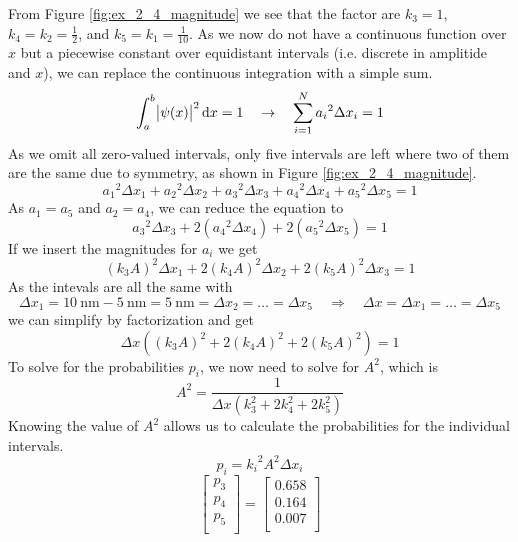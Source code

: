 From Figure \ref{fig:ex_2_4_magnitude} we see that the factor are
$k_3 = 1$, $k_4=k_2=\frac{1}{2}$, and $k_5=k_1=\frac{1}{10}$.
As we now do not have a continuous function over $x$ but a piecewise
constant over equidistant intervals (i.e. discrete in amplitide and $x$),
we can replace the continuous integration with a simple sum.
\[
	\int_a^b \abs{\psi(x)}^2 \dif x = 1
	\quad \rightarrow \quad
	\sum_{i=1}^{N} {a_i}^2 \Delta x_i = 1
\]
As we omit all zero-valued intervals, only five intervals are left where two
of them are the same due to symmetry, as shown in Figure
\ref{fig:ex_2_4_magnitude}.
\[
	{a_1}^2 \Delta x_1 + {a_2}^2 \Delta x_2 + {a_3}^2 \Delta x_3 + {a_4}^2 \Delta x_4 + {a_5}^2 \Delta x_5 = 1
\]
As $a_1 = a_5$ and $a_2 = a_4$, we can reduce the equation to
\[
	{a_3}^2 \Delta x_3 + 2 \left({a_4}^2 \Delta x_4\right) + 2 \left({a_5}^2 \Delta x_5\right) = 1
\]
If we insert the magnitudes for $a_i$ we get
\[
	\left(k_3A\right)^2 \Delta x_1 + 2 \left(k_4A\right)^2 \Delta x_2 + 2 \left(k_5A\right)^2 \Delta x_3 = 1
\]
As the intevals are all the same with
\[
	\Delta x_1
	= \SI{10}{\nano\m} - \SI{5}{\nano\m}
	= \SI{5}{\nano\m}
	= \Delta x_2 = \dots = \Delta x_5
	\quad \Rightarrow \quad 
	\Delta x = \Delta x_1 = \dots = \Delta x_5
\]
we can simplify by factorization and get
\[
	\Delta x \left( \left(k_3A\right)^2 + 2 \left(k_4A\right)^2 + 2 \left(k_5A\right)^2 \right) = 1
\]
To solve for the probabilities $p_i$, we now need to solve for $A^2$, which is
\[
	A^2 = \frac{1}{\Delta x \left(k_3^2 + 2 k_4^2 + 2 k_5^2\right)}
\]
Knowing the value of $A^2$ allows us to calculate the probabilities for the
individual intervals.
\[
	p_i = {k_i}^2 A^2 \Delta x_i
\]
\[
	\begin{bmatrix}
		p_3 \\
		p_4 \\
		p_5 \\
	\end{bmatrix}
	=
	\begin{bmatrix}
		0.658 \\
		0.164 \\
		0.007 \\
	\end{bmatrix}	
\]



